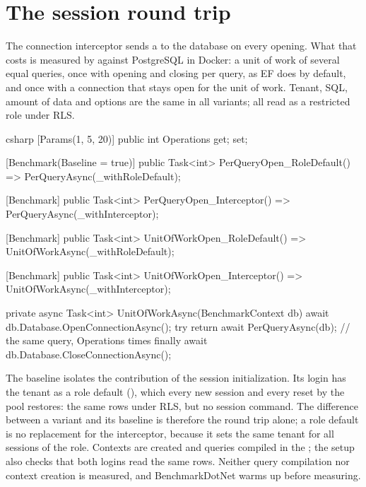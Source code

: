 \section{The session round trip}

The connection interceptor sends a  to the database on every opening. What
that costs is measured by  against
PostgreSQL in Docker: a unit of work of several equal queries, once with opening and closing per
query, as EF does by default, and once with a connection that stays open for the unit of work.
Tenant, SQL, amount of data and options are the same in all variants; all read as a restricted
role under RLS.

\begin{sourcecode}{csharp}
[Params(1, 5, 20)]
public int Operations { get; set; }

[Benchmark(Baseline = true)]
public Task<int> PerQueryOpen_RoleDefault() => PerQueryAsync(_withRoleDefault);

[Benchmark]
public Task<int> PerQueryOpen_Interceptor() => PerQueryAsync(_withInterceptor);

[Benchmark]
public Task<int> UnitOfWorkOpen_RoleDefault() => UnitOfWorkAsync(_withRoleDefault);

[Benchmark]
public Task<int> UnitOfWorkOpen_Interceptor() => UnitOfWorkAsync(_withInterceptor);

private async Task<int> UnitOfWorkAsync(BenchmarkContext db)
{
    await db.Database.OpenConnectionAsync();
    try
    {
        return await PerQueryAsync(db);       // the same query, Operations times
    }
    finally
    {
        await db.Database.CloseConnectionAsync();
    }
}
\end{sourcecode}

The baseline isolates the contribution of the session initialization. Its login has the tenant
as a role default (), which every new session and every
reset by the pool restores: the same rows under RLS, but no session command. The difference
between a variant and its baseline is therefore the  round trip alone; a role
default is no replacement for the interceptor, because it sets the same tenant for all sessions
of the role. Contexts are created and queries compiled in the ;
the setup also checks that both logins read the same rows. Neither query compilation nor context
creation is measured, and BenchmarkDotNet warms up before measuring.

